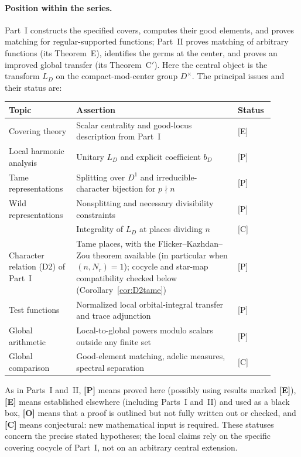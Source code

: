 \documentclass[11pt]{article}
\theoremstyle{plain}
\theoremstyle{definition}
\begin{document}
\paragraph{Position within the series.}
Part~I constructs the specified covers, computes their good elements, and
proves matching for regular-supported functions; Part~II proves matching of
arbitrary functions (its Theorem~E), identifies the germs at the center, and
proves an improved global transfer (its Theorem~C$'$). Here the central object
is the transform $L_D$ on the compact-mod-center group $D^\times$.
The principal issues and their status are:
\begin{center}
\small
\begin{tabular}{@{}p{0.23\linewidth}p{0.57\linewidth}p{0.10\linewidth}@{}}
\toprule
\textbf{Topic} & \textbf{Assertion} & \textbf{Status}\\
\midrule
Covering theory & Scalar centrality and good-locus description from Part~I & [E]\\
Local harmonic analysis & Unitary $L_D$ and explicit coefficient $b_D$ & [P]\\
Tame representations & Splitting over $D^1$ and irreducible-character bijection for $p\nmid n$ & [P]\\
Wild representations & Nonsplitting and necessary divisibility constraints & [P]\\
 & Integrality of $L_D$ at places dividing $n$ & [C]\\
Character relation (D2) of Part~I & Tame places, with the Flicker--Kazhdan--Zou theorem available (in particular when $(n,N_r)=1$); cocycle and star-map compatibility checked below (Corollary~\ref{cor:D2tame}) & [P]\\
Test functions & Normalized local orbital-integral transfer and trace adjunction & [P]\\
Global arithmetic & Local-to-global powers modulo scalars outside any finite set & [P]\\
Global comparison & Good-element matching, adelic measures, spectral separation & [C]\\
\bottomrule
\end{tabular}
\end{center}
As in Parts~I and~II, \textbf{[P]} means proved here (possibly using
results marked \textbf{[E]}), \textbf{[E]} means established elsewhere
(including Parts~I and~II) and used as a black box, \textbf{[O]} means that
a proof is outlined but not fully written out or checked, and \textbf{[C]}
means conjectural: new mathematical input is required.
These statuses concern the precise stated hypotheses; the local
claims rely on the specific covering cocycle of Part~I, not on
an arbitrary central extension.
\end{document}
